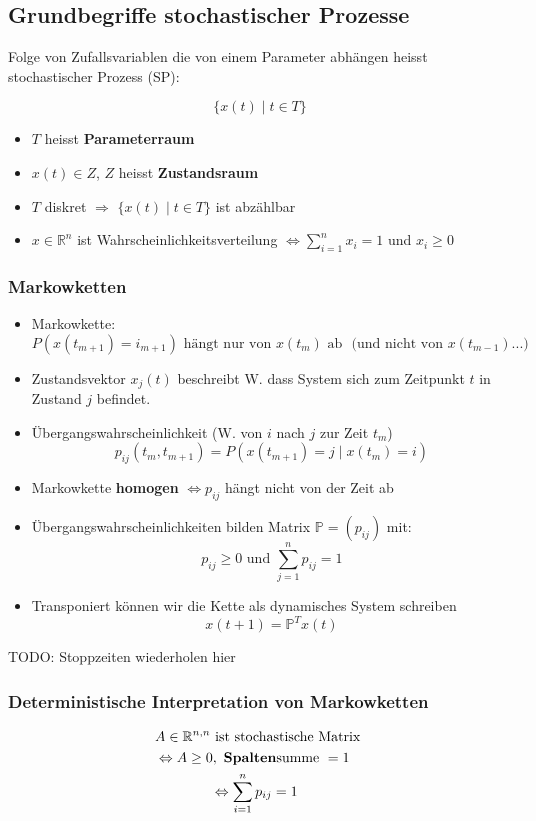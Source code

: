 \documentclass[a4paper]{article}
\newcommand{\R}{\mathbb{R}}
\begin{document}
\subsection{Grundbegriffe stochastischer Prozesse}
Folge von Zufallsvariablen die von einem Parameter
abhängen heisst stochastischer Prozess (SP):

\[
\{
	x(t) \; \vert \; t \in T
\} 
\] 

\begin{itemize}
	\item $T$ heisst \textbf{Parameterraum} 
	\item $x(t) \in Z$, $Z$ heisst \textbf{Zustandsraum} 
	\item $T$ diskret $\Rightarrow$ $\{
			x(t) \; \vert \; t \in T
	\} $ ist abzählbar
	\item $x \in \R ^{n}$ ist Wahrscheinlichkeitsverteilung
		$\Leftrightarrow \sum_{i=1}^{n} x_{i} = 1$
		und $x_{i} \geq 0$
\end{itemize}

\subsubsection{Markowketten}
\begin{itemize}
	\item Markowkette:
		\[
			P(x(t_{m+1}) = i_{m+1})
			\text{ hängt nur von $x(t_m)$ ab }
			\text{ (und nicht von $x(t_{m-1})...$) }
		\] 
	\item Zustandsvektor $x_{j} (t)$ beschreibt W. dass System
		sich zum Zeitpunkt $t$ in Zustand $j$ befindet.
	\item Übergangswahrscheinlichkeit (W. von $i$ nach $j$ zur Zeit $t_m$)
		\[
			p_{ij} (t_m , t_{m+1}) =
			P(x(t_{m+1}) = j \; \vert \; x(t_m) = i)
		\] 
	\item Markowkette \textbf{homogen} $\Leftrightarrow
		p_{ij}$ hängt nicht von der Zeit ab
	\item Übergangswahrscheinlichkeiten bilden Matrix $\mathbb{P} = (p_{ij})$
		mit:
		\[
		p_{ij} \geq 0 \text{ und }
		\sum_{j=1}^{n} p_{ij} = 1
		\] 
	\item Transponiert können wir die Kette als dynamisches System schreiben
		\[
			x(t+1) = \mathbb{P} ^{T} x(t)
		\] 
\end{itemize}

TODO: Stoppzeiten wiederholen hier

\subsubsection{Deterministische Interpretation von Markowketten}
\begin{align*}
	& A \in \R ^{n,n} \text{ ist stochastische Matrix } \\
	&\Leftrightarrow A \geq 0, \text{ \textbf{Spalten}summe } = 1 \\
	& \qquad \qquad \Leftrightarrow \sum_{i=1}^{n} p_{ij} = 1 \\
\end{align*}
\end{document}
